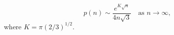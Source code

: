 $$p(n) \sim \frac{e^{K\sqrt{n}}}{4n\sqrt{3}} \quad \text{as } n \to \infty,$$
where $K = \pi(2/3)^{1/2}$.
